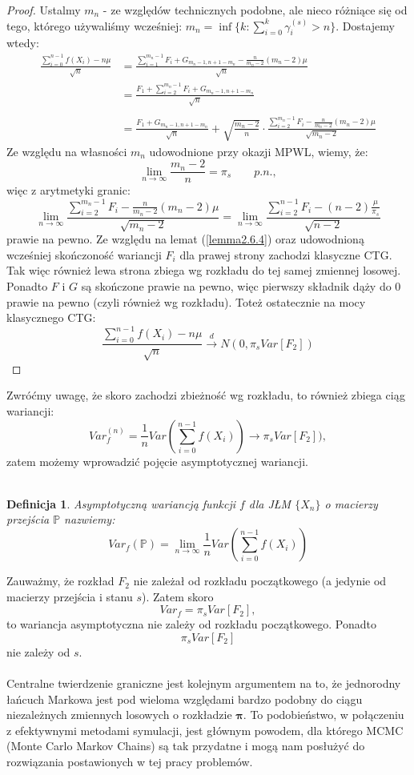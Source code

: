\documentclass[a4paper]{article}
\theoremstyle{defn}
\newtheorem{defn}{Definicja}[subsection]
\theoremstyle{theorem}
\theoremstyle{lemma}
\theoremstyle{cor}
\theoremstyle{fact}
\begin{document}
\begin{proof}
Ustalmy $m_n$ - ze względów technicznych podobne, ale nieco różniące się od tego, którego używaliśmy wcześniej:
$m_n = \inf \{k: \sum\limits_{i=0}^k \gamma_i^{(s)} > n\}$. Dostajemy wtedy:
\begin{align*}
    \frac{\sum\limits_{i=0}^{n-1} f(X_i) - n\mu}{\sqrt{n}} &= \frac{\sum\limits_{i=1}^{m_n-1} F_i + G_{m_n-1, n+ 1 - m_n} - \frac{n}{m_n-2}(m_n - 2)\mu}{\sqrt{n}}\\
    &= \frac{F_1 + \sum\limits_{i=2}^{m_n-1} F_i + G_{m_n-1, n+1 - m_n}}{\sqrt{n}}\\\\
    &= \frac{F_1 + G_{m_n-1, n + 1 - m_n} }{\sqrt{n}} + \sqrt{\frac{m_n -2}{n}} \cdot \frac{\sum\limits_{i=2}^{m_n-1} F_i  - \frac{n}{m_n-2}(m_n - 2)\mu}{\sqrt{m_n-2}}
\end{align*}
Ze względu na własności $m_n$ udowodnione przy okazji MPWL, wiemy, że:
$$ \lim\limits_{n \to \infty} \frac{m_n -2}{n} = \pi_s \quad\quad p.n.,$$
więc z arytmetyki granic:
$$\lim\limits_{n \to \infty} \frac{\sum\limits_{i=2}^{m_n-1} F_i  - \frac{n}{m_n-2}(m_n - 2)\mu}{\sqrt{m_n-2}} = \lim\limits_{n \to \infty} \frac{\sum\limits_{i=2}^{n-1} F_i - (n-2)\frac{\mu}{\pi_s}}{\sqrt{n-2}}$$
prawie na pewno. Ze względu na lemat (\ref{lemma2.6.4}) oraz udowodnioną wcześniej skończoność wariancji $F_i$ dla prawej strony zachodzi klasyczne CTG. Tak więc również lewa strona zbiega wg rozkładu do tej samej zmiennej losowej. Ponadto $F$ i $G$ są skończone prawie na pewno, więc pierwszy składnik dąży do 0 prawie na pewno (czyli również wg rozkładu).
Toteż ostatecznie na mocy klasycznego CTG:
$$\frac{\sum\limits_{i=0}^{n-1} f(X_i) - n\mu}{\sqrt{n}} \overset{d}{\to} N(0, \pi_s Var[F_2])$$
\end{proof}
Zwróćmy uwagę, że skoro zachodzi zbieżność wg rozkładu, to również zbiega ciąg wariancji:
$$Var_f^{(n)} = \frac{1}{n} Var\left(\sum\limits_{i=0}^{n-1} f(X_i)\right) \to \pi_s Var[F_2]),$$
zatem możemy wprowadzić pojęcie asymptotycznej wariancji.\\\\
\begin{defn}\label{defn2.6.6}
Asymptotyczną wariancją funkcji $f$ dla JŁM $\{X_n\}$ o macierzy przejścia $\mathbb{P}$ nazwiemy:
$$Var_{f}(\mathbb{P}) = \lim\limits_{n \to \infty} \frac{1}{n} Var\left(\sum\limits_{i=0}^{n-1} f(X_i)\right)$$
\end{defn}
Zauważmy, że rozkład $F_2$ nie zależał od rozkładu początkowego (a jedynie od macierzy przejścia i stanu $s$). Zatem skoro $$Var_f = \pi_s Var[F_2],$$
to wariancja asymptotyczna nie zależy od rozkładu początkowego. Ponadto
$$\pi_s Var[F_2]$$
nie zależy od $s$.\\\\
Centralne twierdzenie graniczne jest kolejnym argumentem na to, że jednorodny łańcuch Markowa jest pod wieloma względami bardzo podobny do ciągu niezależnych zmiennych losowych o rozkładzie $\boldsymbol{\pi}$. To podobieństwo, w połączeniu z efektywnymi metodami symulacji, jest głównym powodem, dla którego MCMC (Monte Carlo Markov Chains) są tak przydatne i mogą nam posłużyć do rozwiązania postawionych w tej pracy problemów.\\
\end{document}
